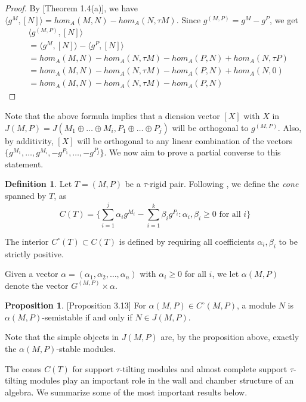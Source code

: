 \documentclass[]{article}
\theoremstyle{definition}
\newtheorem{definition}{Definition}[section]
\newtheorem{proposition}{Proposition}[section]
\newcommand{\tu}{\ensuremath{\tau}}
\begin{document}
\begin{proof}
	By \cite{auslander1985modules}[Theorem 1.4(a)], we have $\langle g^M,[N]\rangle = hom_A(M,N) - hom_A(N,\tau M)$. Since $g^{(M,P)} = g^M - g^P$, we get
	\begin{align}
	&\langle g^{(M,P)},[N]\rangle \\
	&=\langle g^M,[N]\rangle - \langle g^P,[N]\rangle \\
	&=hom_A(M,N) - hom_A(N,\tau M) - hom_A(P,N) + hom_A(N,\tau P) \\
	&=hom_A(M,N) - hom_A(N,\tau M) - hom_A(P,N) + hom_A(N,0)\\
	&=hom_A(M,N) - hom_A(N,\tau M) -hom_A(P,N)
	\end{align}
\end{proof}

Note that the above formula implies that a diension vector $[X]$ with $X$ in $J(M,P) = J(M_1\oplus\dots\oplus M_i,P_1\oplus\dots\oplus P_j)$ will be orthogonal to $g^{(M,P)}$. Also, by additivity, $[X]$ will be orthogonal to any linear combination of the vectors $\{g^{M_1},\dots,g^{M_i},-g^{P_1},\dots,-g^{P_j}\}$. We now aim to prove a partial converse to this statement.
\begin{definition}
	Let $T = (M,P)$ be a \tu-rigid pair. Following \cite{dij17}, we define the \textit{cone} spanned by $T$, as \[C(T) = \{\sum_{i = 1}^{j} \alpha_ig^{M_i} - \sum_{i = 1}^{k}\beta_ig^{P_i} : \alpha_i,\beta_i \geq 0 \text{ for all } i\}\]
	
	The interior $C^\circ(T) \subset C(T)$ is defined by requiring all coefficients $\alpha_i,\beta_i$ to be strictly positive.
\end{definition} 

Given a vector $\alpha = (\alpha_1,\alpha_2,\dots,\alpha_n)$ with $\alpha_i \geq 0$ for all $i$, we let $\alpha(M,P)$ denote the vector $G^{(M,P)} \times \alpha$.

\begin{proposition}\cite{Br_stle_2019}[Proposition 3.13]
	For $\alpha(M,P) \in C^\circ(M,P)$, a module $N$ is $\alpha(M,P)$-semistable if and only if $N \in J(M,P)$.
\end{proposition}

Note that the simple objects in $J(M,P)$ are, by the proposition above, exactly the $\alpha(M,P)$-stable modules.

The cones $C(T)$ for support \tu-tilting modules and almost complete support \tu-tilting modules play an important role in the wall and chamber structure of an algebra. We summarize some of the most important results below.
\end{document}
